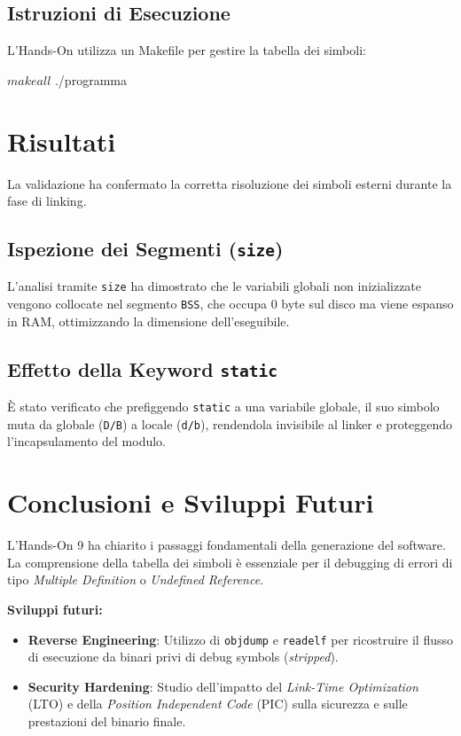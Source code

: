 \documentclass[a4paper,12pt]{article}
\begin{document}
\subsection{Istruzioni di Esecuzione}
L'Hands-On utilizza un Makefile per gestire la tabella dei simboli:
\begin{terminal}[Makefile]
$ make all
$ ./programma
\end{terminal}

\section{Risultati}
La validazione ha confermato la corretta risoluzione dei simboli esterni durante la fase di linking.

\subsection{Ispezione dei Segmenti (\texttt{size})}
L'analisi tramite \texttt{size} ha dimostrato che le variabili globali non inizializzate vengono collocate nel segmento \texttt{BSS}, che occupa $0$ byte sul disco ma viene espanso in RAM, ottimizzando la dimensione dell'eseguibile.

\subsection{Effetto della Keyword \texttt{static}}
È stato verificato che prefiggendo \texttt{static} a una variabile globale, il suo simbolo muta da globale (\texttt{D/B}) a locale (\texttt{d/b}), rendendola invisibile al linker e proteggendo l'incapsulamento del modulo.

\section{Conclusioni e Sviluppi Futuri}
L'Hands-On 9 ha chiarito i passaggi fondamentali della generazione del software. La comprensione della tabella dei simboli è essenziale per il debugging di errori di tipo \textit{Multiple Definition} o \textit{Undefined Reference}.

\noindent \textbf{Sviluppi futuri:}
\begin{itemize}
    \item \textbf{Reverse Engineering}: Utilizzo di \texttt{objdump} e \texttt{readelf} per ricostruire il flusso di esecuzione da binari privi di debug symbols (\textit{stripped}).
    \item \textbf{Security Hardening}: Studio dell'impatto del \textit{Link-Time Optimization} (LTO) e della \textit{Position Independent Code} (PIC) sulla sicurezza e sulle prestazioni del binario finale.
\end{itemize}
\end{document}
